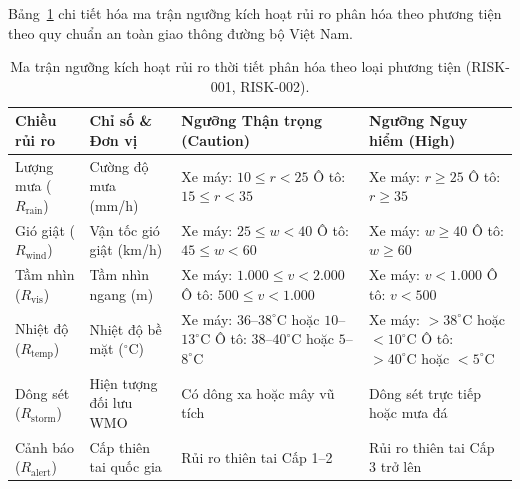 Bảng~\ref{tab:vehicle_risk_matrix_vi} chi tiết hóa ma trận ngưỡng kích hoạt rủi ro phân hóa theo phương tiện theo quy chuẩn an toàn giao thông đường bộ Việt Nam.

\begin{table}[H]
\centering
\small
\caption[Ma trận ngưỡng rủi ro phân hóa theo loại phương tiện]{Ma trận ngưỡng kích hoạt rủi ro thời tiết phân hóa theo loại phương tiện (RISK-001, RISK-002).}
\label{tab:vehicle_risk_matrix_vi}
\begin{tabularx}{\textwidth}{l >{\raggedright\arraybackslash}p{2.8cm} X X}
\toprule
\textbf{Chiều rủi ro} & \textbf{Chỉ số \& Đơn vị} & \textbf{Ngưỡng Thận trọng (Caution)} & \textbf{Ngưỡng Nguy hiểm (High)} \\
\midrule
Lượng mưa ($R_{\text{rain}}$) & Cường độ mưa (mm/h) & 
Xe máy: $10 \le r < 25$ \newline Ô tô: $15 \le r < 35$ & 
Xe máy: $r \ge 25$ \newline Ô tô: $r \ge 35$ \\
\addlinespace
Gió giật ($R_{\text{wind}}$) & Vận tốc gió giật (km/h) & 
Xe máy: $25 \le w < 40$ \newline Ô tô: $45 \le w < 60$ & 
Xe máy: $w \ge 40$ \newline Ô tô: $w \ge 60$ \\
\addlinespace
Tầm nhìn ($R_{\text{vis}}$) & Tầm nhìn ngang (m) & 
Xe máy: $1.000 \le v < 2.000$ \newline Ô tô: $500 \le v < 1.000$ & 
Xe máy: $v < 1.000$ \newline Ô tô: $v < 500$ \\
\addlinespace
Nhiệt độ ($R_{\text{temp}}$) & Nhiệt độ bề mặt ($^\circ\text{C}$) & 
Xe máy: $36$--$38^\circ\text{C}$ hoặc $10$--$13^\circ\text{C}$ \newline Ô tô: $38$--$40^\circ\text{C}$ hoặc $5$--$8^\circ\text{C}$ & 
Xe máy: $> 38^\circ\text{C}$ hoặc $< 10^\circ\text{C}$ \newline Ô tô: $> 40^\circ\text{C}$ hoặc $< 5^\circ\text{C}$ \\
\addlinespace
Dông sét ($R_{\text{storm}}$) & Hiện tượng đối lưu WMO & 
Có dông xa hoặc mây vũ tích & 
Dông sét trực tiếp hoặc mưa đá \\
\addlinespace
Cảnh báo ($R_{\text{alert}}$) & Cấp thiên tai quốc gia & 
Rủi ro thiên tai Cấp 1--2 & 
Rủi ro thiên tai Cấp 3 trở lên \\
\bottomrule
\end{tabularx}
\end{table}

